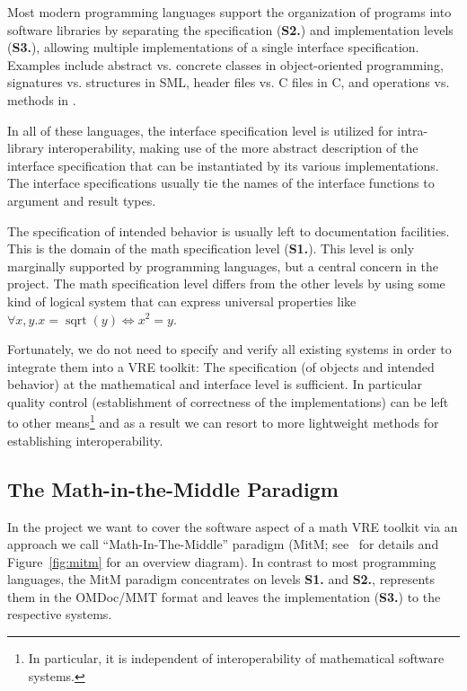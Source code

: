 Most modern programming languages support the organization of programs into software
libraries by separating the specification (\textbf{S2.}) and implementation levels
(\textbf{S3.}), allowing multiple implementations of a single interface specification. Examples include
abstract vs. concrete classes in object-oriented programming, signatures vs. structures in
SML, header files vs. C files in C, and operations vs. methods in \GAP.

In all of these languages, the interface specification level is utilized for intra-library interoperability, making use
of the more abstract description of the interface specification that can be instantiated
by its various implementations. The interface specifications usually tie the names of the
interface functions to argument and result types.

The specification of intended behavior is usually left to documentation facilities. This is the domain of the math specification
level (\textbf{S1.}).
This level is only marginally supported by programming languages, but a
central concern in the \pn project.
The math specification level differs from the other levels by using some kind of logical system that can express universal properties like
$\forall x,y. x=\operatorname{sqrt}(y) \Leftrightarrow x^2=y$.

Fortunately, we do not need to specify and verify all existing systems in order to integrate them into a VRE toolkit: The specification (of objects and intended behavior) at the mathematical and interface level is sufficient. In particular quality control
(establishment of correctness of the implementations) can be left to other
means\footnote{In particular, it is independent of interoperability of mathematical
  software systems.} and as a result we can resort to more lightweight methods for
establishing interoperability.

\subsection{The Math-in-the-Middle Paradigm}

In the \pn project we want to cover the software aspect of a math VRE toolkit via an
approach we call ``Math-In-The-Middle'' paradigm (MitM; see~\cite{DehKohKon:iop16} for
details and Figure~\ref{fig:mitm} for an overview diagram). In contrast to most
programming languages, the MitM paradigm concentrates on levels \textbf{S1.} and \textbf{S2.},
represents them in the OMDoc/MMT format and leaves the implementation (\textbf{S3.}) to
the respective systems.

